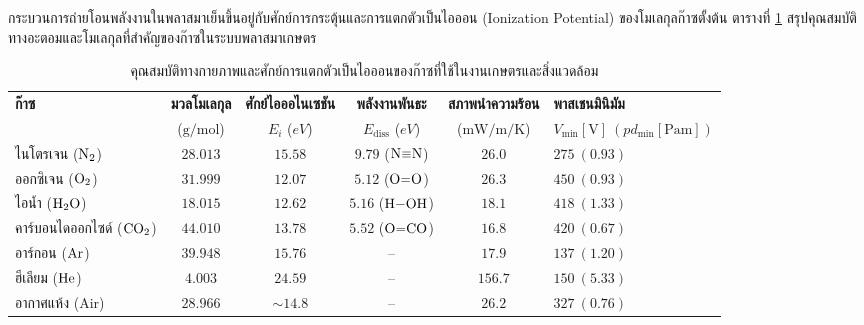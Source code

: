 กระบวนการถ่ายโอนพลังงานในพลาสมาเย็นขึ้นอยู่กับศักย์การกระตุ้นและการแตกตัวเป็นไอออน (Ionization Potential) ของโมเลกุลก๊าซตั้งต้น ตารางที่ \ref{tab:app_gas_properties} สรุปคุณสมบัติทางอะตอมและโมเลกุลที่สำคัญของก๊าซในระบบพลาสมาเกษตร

\begin{table}[H]
\centering
\caption{คุณสมบัติทางกายภาพและศักย์การแตกตัวเป็นไอออนของก๊าซที่ใช้ในงานเกษตรและสิ่งแวดล้อม}
\label{tab:app_gas_properties}
\begin{tabularx}{\textwidth}{l c c c c X}
\toprule
\textbf{ก๊าซ} & \textbf{มวลโมเลกุล} & \textbf{ศักย์ไอออไนเซชัน} & \textbf{พลังงานพันธะ} & \textbf{สภาพนำความร้อน} & \textbf{พาสเชนมินิมัม} \\
& ($\si{\gram\per\mole}$) & $E_i$ ($\si{eV}$) & $E_{\text{diss}}$ ($\si{eV}$) & ($\si{\milli\watt\per\meter\per\kelvin}$) & $V_{\min} [\si{\volt}] \ (pd_{\min} [\si{\pascal\meter}])$ \\
\midrule
ไนโตรเจน ($\ce{N2}$) & $28.013$ & $15.58$ & $9.79$ ($\ce{N#N}$) & $26.0$ & $275\ (0.93)$ \\
ออกซิเจน ($\ce{O2}$) & $31.999$ & $12.07$ & $5.12$ ($\ce{O=O}$) & $26.3$ & $450\ (0.93)$ \\
ไอน้ำ ($\ce{H2O}$) & $18.015$ & $12.62$ & $5.16$ ($\ce{H-OH}$) & $18.1$ & $418\ (1.33)$ \\
คาร์บอนไดออกไซด์ ($\ce{CO2}$) & $44.010$ & $13.78$ & $5.52$ ($\ce{O=CO}$) & $16.8$ & $420\ (0.67)$ \\
อาร์กอน ($\ce{Ar}$) & $39.948$ & $15.76$ & -- & $17.9$ & $137\ (1.20)$ \\
ฮีเลียม ($\ce{He}$) & $4.003$ & $24.59$ & -- & $156.7$ & $150\ (5.33)$ \\
อากาศแห้ง (Air) & $28.966$ & $\sim 14.8$ & -- & $26.2$ & $327\ (0.76)$ \\
\bottomrule
\end{tabularx}
\end{table}

